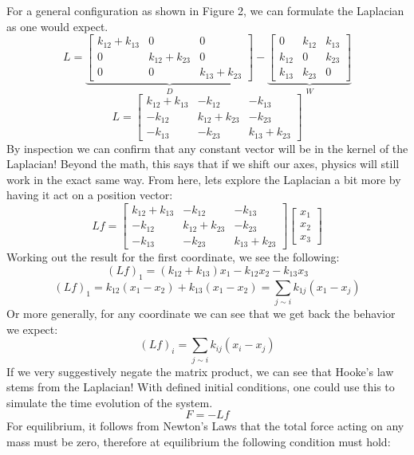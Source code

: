 For a general configuration as shown in Figure 2, we can formulate the
Laplacian as one would expect.
\[
L = \underbrace{\begin{bmatrix}
    k_{12} + k_{13} & 0 & 0 \\
    0 & k_{12} + k_{23}   & 0 \\
    0 & 0 & k_{13} + k_{23} 
\end{bmatrix}}_\text{\(D\)} -
\underbrace{
\begin{bmatrix}
    0      & k_{12} & k_{13} \\
    k_{12} & 0      & k_{23} \\
    k_{13} & k_{23} & 0 
\end{bmatrix}}_\text{\(W\)}
\]
\[
L = \begin{bmatrix}
    k_{12} + k_{13} & -k_{12} & -k_{13} \\
    -k_{12} & k_{12} + k_{23} & -k_{23} \\
    -k_{13} & -k_{23} & k_{13} + k_{23} 
\end{bmatrix}
\]
By inspection we can confirm that any constant vector will be in the
kernel of the Laplacian! Beyond the math, this says that if we shift
our axes, physics will still work in the exact same way. From here,
lets explore the Laplacian a bit more by having it act on a position
vector: 
\[
Lf = \begin{bmatrix}
    k_{12} + k_{13} & -k_{12} & -k_{13} \\
    -k_{12} & k_{12} + k_{23} & -k_{23} \\
    -k_{13} & -k_{23} & k_{13} + k_{23} 
\end{bmatrix}
\begin{bmatrix}
x_1 \\
x_2\\
x_3
\end{bmatrix}
\]
Working out the result for the first coordinate, we see the following: 
\[
(Lf)_1 = 
    (k_{12} + k_{13})x_1 -k_{12}x_2 -k_{13}x_3 
\]
\[
(Lf)_1 = 
    k_{12}(x_1 - x_2) + k_{13}(x_1 - x_2) = \sum_{j \sim i} k_{1j}(x_1 - x_j)
\]
Or more generally, for any coordinate we can see that we get back the
behavior we expect: 
\[
(Lf)_i = \sum_{j \sim i} k_{ij}(x_i - x_j)
\]
If we very suggestively negate the matrix product, we can see that
Hooke's law stems from the Laplacian! With defined initial conditions,
one could use this to simulate the  time evolution of the system. 
\[
F = -Lf
\]
For equilibrium, it follows from Newton's Laws that the total force
acting on any mass must be zero, therefore at equilibrium the
following condition must hold: 
